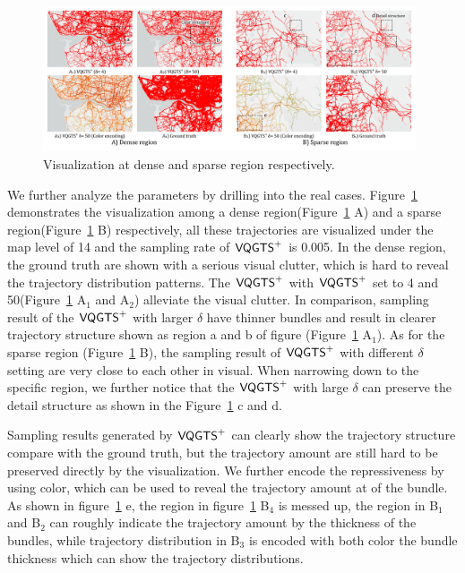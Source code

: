 \begin{figure}[t]
	\centering
	\vspace{2mm}
	\includegraphics[width=0.98\textwidth]{pictures/experiment_study/case_study2_delta_comparison.pdf}
	\caption{Visualization at dense and sparse region respectively.}
	\vspace{0mm}
	\label{fig:representative_parameters}
\end{figure}

We further analyze the  parameters by drilling into the real cases. Figure~\ref{fig:representative_parameters} demonstrates the visualization among a dense region(Figure~\ref{fig:representative_parameters} A) and a sparse region(Figure~\ref{fig:representative_parameters} B) respectively, all these trajectories are visualized under the map level of 14 and the sampling rate of $\mathsf{VQGTS}^{+}$ is 0.005. In the dense region, the ground truth are shown with a serious visual clutter, which is hard to reveal the trajectory distribution patterns. The $\mathsf{VQGTS}^{+}$ with $\mathsf{VQGTS}^{+}$ set to 4 and 50(Figure~\ref{fig:representative_parameters} A$_1$ and A$_2$) alleviate the visual clutter. In comparison, sampling result of the $\mathsf{VQGTS}^{+}$ with larger $\delta$ have thinner bundles and result in clearer trajectory structure shown as region a and b of figure (Figure~\ref{fig:representative_parameters} A$_1$). As for the sparse region (Figure~\ref{fig:representative_parameters} B), the sampling result of $\mathsf{VQGTS}^{+}$ with different $\delta$ setting are very close to each other in visual. When narrowing down to the specific region, we further notice that the $\mathsf{VQGTS}^{+}$ with large $\delta$ can preserve the detail structure as shown in the Figure~\ref{fig:representative_parameters} c and d. 

Sampling results generated by $\mathsf{VQGTS}^{+}$ can clearly show the trajectory structure compare with the ground truth, but the trajectory amount are still hard to be preserved directly by the visualization. We further encode the repressiveness by using color, which can be used to reveal the trajectory amount at of the bundle. As shown in figure~\ref{fig:representative_parameters} e, the region in figure~\ref{fig:representative_parameters} B$_4$ is messed up, the region in B$_1$ and B$_2$ can roughly indicate the trajectory amount by the thickness of the bundles, while trajectory distribution  in B$_3$ is encoded with both color the bundle thickness which can show the trajectory distributions. 


